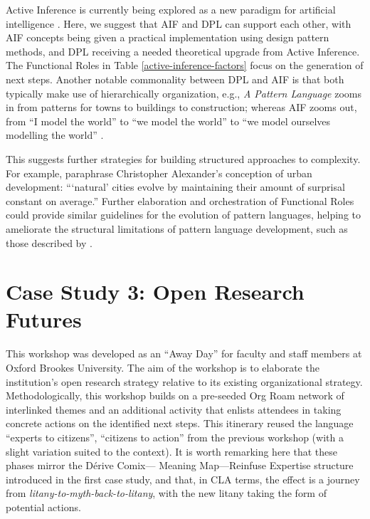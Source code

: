 \documentclass[acmlarge,timestamp]{acmart}
\begin{document}
Active Inference is currently being explored as a new paradigm for
artificial intelligence
\cite{friston2022designing,albarracin2023designing}.  Here, we suggest
that AIF and DPL can support each other, with AIF concepts being given
a practical implementation using design pattern methods, and DPL
receiving a needed theoretical upgrade from Active Inference.  The
{\sc Functional Roles} in Table \ref{active-inference-factors} focus
on the generation of next steps.  Another notable commonality between
DPL and AIF is that both typically make use of hierarchically
organization, e.g., \emph{A Pattern Language} zooms in from patterns
for towns to buildings to construction; whereas AIF zooms out, from “I
model the world” to “we model the world” to “we model ourselves
modelling the world” \cite{Kirchhoff2018}.

This suggests further strategies for building structured approaches to
complexity.  For example, \citet{benoit2019structure} paraphrase
Christopher Alexander’s conception of urban development: “‘natural’
cities evolve by maintaining their amount of surprisal constant on
average.”  Further elaboration and orchestration of {\sc Functional
  Roles} could provide similar guidelines for the evolution of pattern
languages, helping to ameliorate the structural limitations of pattern
language development, such as those described by \citet{Dawes2018}.



\clearpage
\section{Case Study 3: Open Research Futures}

This workshop was developed as an “Away Day” for faculty and staff
members at Oxford Brookes University.  The aim of the workshop is to
elaborate the institution’s open research strategy relative to its
existing organizational strategy.  Methodologically, this workshop
builds on a pre-seeded Org Roam network of interlinked themes and an
additional activity that enlists attendees in taking concrete actions
on the identified next steps.  This itinerary reused the language
“experts to citizens”, “citizens to action” from the previous workshop
(with a slight variation suited to the context).  It is worth
remarking here that these phases mirror the {\sc Dérive Comix}—{\sc
  Meaning Map}—{\sc Reinfuse Expertise} structure introduced in the
first case study, and that, in CLA terms, the effect is a journey from
\emph{litany-to-myth-back-to-litany}, with the new litany taking the
form of potential actions.
\end{document}
